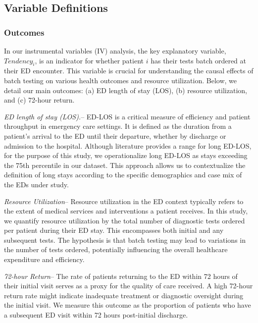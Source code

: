 \documentclass[,,nonblindrev]{informs}
\begin{document}
\hypertarget{variable-definitions}{%
\subsection{Variable Definitions}\label{variable-definitions}}

\hypertarget{outcomes}{%
\subsubsection{Outcomes}\label{outcomes}}

In our instrumental variables (IV) analysis, the key explanatory
variable, \(Tendency_i\), is an indicator for whether patient \(i\) has
their tests batch ordered at their ED encounter. This variable is
crucial for understanding the causal effects of batch testing on various
health outcomes and resource utilization. Below, we detail our main
outcomes: (a) ED length of stay (LOS), (b) resource utilization, and (c)
72-hour return.

\emph{ED length of stay (LOS).}-- ED-LOS is a critical measure of
efficiency and patient throughput in emergency care settings. It is
defined as the duration from a patient's arrival to the ED until their
departure, whether by discharge or admission to the hospital. Although
literature provides a range for long ED-LOS, for the purpose of this
study, we operationalize long ED-LOS as stays exceeding the 75th
percentile in our dataset. This approach allows us to contextualize the
definition of long stays according to the specific demographics and case
mix of the EDs under study.

\emph{Resource Utilization}-- Resource utilization in the ED context
typically refers to the extent of medical services and interventions a
patient receives. In this study, we quantify resource utilization by the
total number of diagnostic tests ordered per patient during their ED
stay. This encompasses both initial and any subsequent tests. The
hypothesis is that batch testing may lead to variations in the number of
tests ordered, potentially influencing the overall healthcare
expenditure and efficiency.

\emph{72-hour Return}-- The rate of patients returning to the ED within
72 hours of their initial visit serves as a proxy for the quality of
care received. A high 72-hour return rate might indicate inadequate
treatment or diagnostic oversight during the initial visit. We measure
this outcome as the proportion of patients who have a subsequent ED
visit within 72 hours post-initial discharge.
\end{document}
